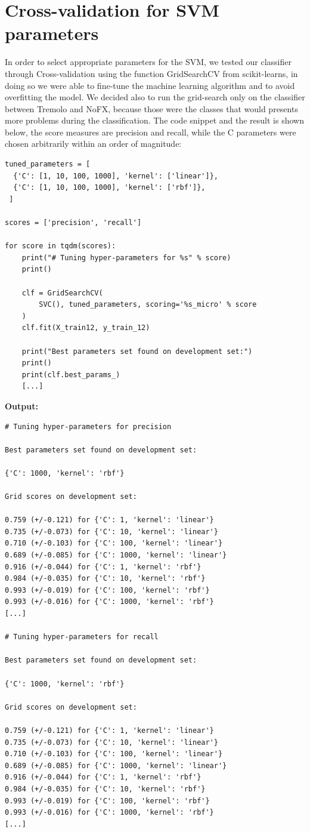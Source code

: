\documentclass[a4paper,12pt]{report}
\begin{document}
\section{Cross-validation for SVM parameters}
In order to select appropriate parameters for the SVM, we tested our classifier through Cross-validation using the function GridSearchCV from scikit-learns, in doing so we were able to fine-tune the machine learning algorithm and to avoid overfitting the model. We decided also to run the grid-search only on the classifier between Tremolo and NoFX, because those were the classes that would presents more problems during the classification. The code snippet and the result is shown below, the score measures are precision and recall, while the C parameters were chosen arbitrarily within an order of magnitude:
\begin{verbatim}
tuned_parameters = [
  {'C': [1, 10, 100, 1000], 'kernel': ['linear']},
  {'C': [1, 10, 100, 1000], 'kernel': ['rbf']},
 ]

scores = ['precision', 'recall']

for score in tqdm(scores):
    print("# Tuning hyper-parameters for %s" % score)
    print()

    clf = GridSearchCV(
        SVC(), tuned_parameters, scoring='%s_micro' % score
    )
    clf.fit(X_train12, y_train_12)

    print("Best parameters set found on development set:")
    print()
    print(clf.best_params_)
    [...]
\end{verbatim}
\hfill \break
\textbf{Output:}

\begin{verbatim}
# Tuning hyper-parameters for precision

Best parameters set found on development set:

{'C': 1000, 'kernel': 'rbf'}

Grid scores on development set:

0.759 (+/-0.121) for {'C': 1, 'kernel': 'linear'}
0.735 (+/-0.073) for {'C': 10, 'kernel': 'linear'}
0.710 (+/-0.103) for {'C': 100, 'kernel': 'linear'}
0.689 (+/-0.085) for {'C': 1000, 'kernel': 'linear'}
0.916 (+/-0.044) for {'C': 1, 'kernel': 'rbf'}
0.984 (+/-0.035) for {'C': 10, 'kernel': 'rbf'}
0.993 (+/-0.019) for {'C': 100, 'kernel': 'rbf'}
0.993 (+/-0.016) for {'C': 1000, 'kernel': 'rbf'}
[...]

# Tuning hyper-parameters for recall

Best parameters set found on development set:

{'C': 1000, 'kernel': 'rbf'}

Grid scores on development set:

0.759 (+/-0.121) for {'C': 1, 'kernel': 'linear'}
0.735 (+/-0.073) for {'C': 10, 'kernel': 'linear'}
0.710 (+/-0.103) for {'C': 100, 'kernel': 'linear'}
0.689 (+/-0.085) for {'C': 1000, 'kernel': 'linear'}
0.916 (+/-0.044) for {'C': 1, 'kernel': 'rbf'}
0.984 (+/-0.035) for {'C': 10, 'kernel': 'rbf'}
0.993 (+/-0.019) for {'C': 100, 'kernel': 'rbf'}
0.993 (+/-0.016) for {'C': 1000, 'kernel': 'rbf'}
[...]
\end{verbatim}
\newpage
\end{document}
